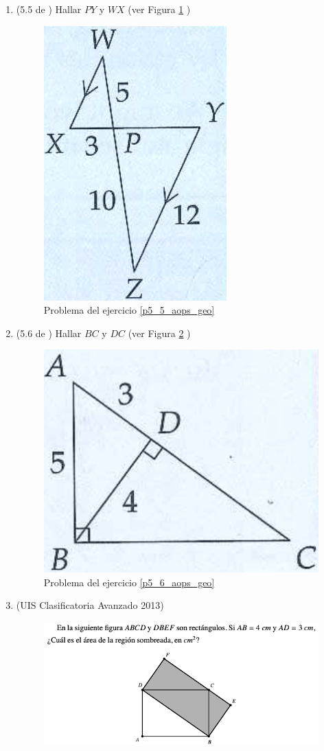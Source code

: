 \begin{enumerate}
\item \label{p5_5_aops_geo}(5.5 de \cite{Aops_Geometria}) Hallar $PY$ y $WX$ (ver Figura \ref{aops_geo_p5_5} )
	\begin{figure}[H]
		\centering
		\includegraphics[width=0.25\linewidth]{Geometria/imgs/aops_geo_p5_5}
		\caption{Problema del ejercicio \ref{p5_5_aops_geo}}
		\label{aops_geo_p5_5}
	\end{figure}

\item \label{p5_6_aops_geo}(5.6 de \cite{Aops_Geometria}) Hallar $BC$ y $DC$ (ver Figura \ref{aops_geo_p5_6} )
\begin{figure}[H]
	\centering
	\includegraphics[width=0.25\linewidth]{Geometria/imgs/aops_geo_p5_6}
	\caption{Problema del ejercicio \ref{p5_6_aops_geo}}
	\label{aops_geo_p5_6}
\end{figure}

\item (UIS Clasificatoria Avanzado 2013) 
	\begin{figure}[H]
		\centering
		\includegraphics[width=0.9\linewidth]{Geometria/imgs/uis_2013_casi_avanzado}
		\label{uis_2013_casi_avanzado.png}
	\end{figure}
\end{enumerate}
\newpage

